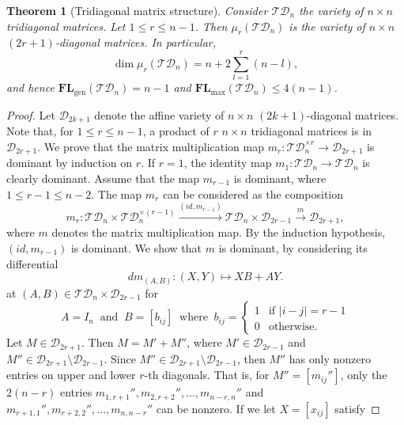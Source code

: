 \documentclass[reqno]{amsart}
\newtheorem{theorem}{Theorem}[section]
\theoremstyle{definition}
\numberwithin{equation}{section}
\begin{document}
\begin{theorem}[Tridiagonal matrix structure]\label{thm:dimension for tridiagonal structure}
    Consider $\mathcal{TD}_n$ the variety of $n \times n$ tridiagonal matrices. Let $1 \leq r \leq n-1$. Then $\mu_{r}(\mathcal{TD}_n)$ is the variety of $n \times n$ $(2r+1)$-diagonal matrices. In particular,
    \begin{equation*}
        \dim \mu_{r}(\mathcal{TD}_n)=n+2\sum_{l=1}^{r}(n-l),
    \end{equation*}
    and hence $\mathbf{FL}_{\text{gen}}(\mathcal{TD}_n)=n-1$ and $\mathbf{FL}_{\text{max}}(\mathcal{TD}_n)\leq 4(n-1)$.
\end{theorem}
\begin{proof}
    Let $\mathcal{D}_{2k+1}$ denote the affine variety of $n \times n$ $(2k+1)$-diagonal matrices. Note that, for $1 \leq r \leq n-1$, a product of $r$ $n \times n$ tridiagonal matrices is in $\mathcal{D}_{2r+1}$. We prove that the matrix multiplication map $m_r:\mathcal{TD}_n^{\times r} \rightarrow \mathcal{D}_{2r+1}$ is dominant by induction on $r$. If $r=1$, the identity map $m_1:\mathcal{TD}_n \rightarrow \mathcal{TD}_n$ is clearly dominant. Assume that the map $m_{r-1}$ is dominant, where $1 \leq r-1 \leq n-2$. The map $m_r$ can be considered as the composition
    \begin{equation*}
        m_r:\mathcal{TD}_n \times \mathcal{TD}_n^{\times (r-1)} \xrightarrow{(id,m_{r-1})}\mathcal{TD}_n \times \mathcal{D}_{2r-1} \xrightarrow{m} \mathcal{D}_{2r+1}, 
    \end{equation*}
    where $m$ denotes the matrix multiplication map. By the induction hypothesis, $(id, m_{r-1})$ is dominant. We show that $m$ is dominant, by considering its differential 
    \begin{equation*}
        dm_{(A,B)}:(X,Y) \mapsto XB+AY.
    \end{equation*}
    at  $(A,B) \in \mathcal{TD}_{n} \times \mathcal{D}_{2r-1}$ for 
    \begin{equation*}
        A=I_n~\text{ and }~B=[b_{ij}]~\text{ where }~b_{ij}=\begin{cases}
            1 & \text{if }|i-j|=r-1\\
            0 & \text{otherwise}.
        \end{cases}
    \end{equation*}
    Let $M \in \mathcal{D}_{2r+1}$. Then $M=M'+M''$, where $M' \in \mathcal{D}_{2r-1}$ and $M'' \in \mathcal{D}_{2r+1} \setminus \mathcal{D}_{2r-1}$. Since $M''\in \mathcal{D}_{2r+1} \setminus \mathcal{D}_{2r-1}$, then $M''$ has only nonzero entries on upper and lower $r$-th diagonals. That is, for $M''=[m_{ij}'']$, only the $2(n-r)$ entries $m_{1,r+1}'',m_{2,r+2}'',...,m_{n-r,n}''$ and $m_{r+1,1}'',m_{r+2,2}'',...,m_{n,n-r}''$ can be nonzero. If we let $X=[x_{ij}]$ satisfy

\end{proof}
\end{document}
